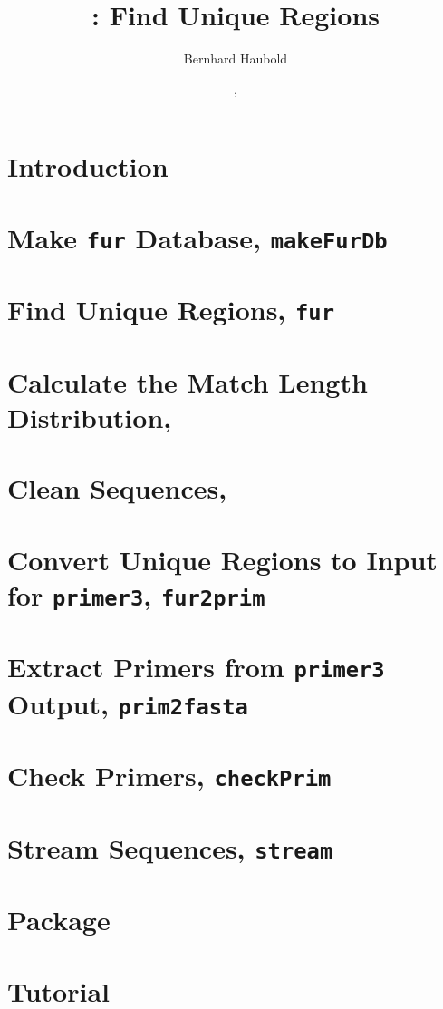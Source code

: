 \documentclass[a4paper]{report}
\begin{document}
\pagestyle{noweb}

\title{: Find Unique Regions}
\author{Bernhard Haubold}
\date{\!\!, }
\maketitle

\tableofcontents

\chapter{Introduction}\label{sec:intro}

\chapter{Make \texttt{fur} Database, \texttt{makeFurDb}}\label{ch:makeFurDb}

\chapter{Find Unique Regions, \texttt{fur}}

\chapter{Calculate the Match Length Distribution, }\label{ch:mad}

\chapter{Clean Sequences, }

\chapter{Convert Unique Regions to Input for \texttt{primer3}, \texttt{fur2prim}}

\chapter{Extract Primers from \texttt{primer3}
Output, \texttt{prim2fasta}}

\chapter{Check Primers, \texttt{checkPrim}}

\chapter{Stream Sequences, \texttt{stream}}

\chapter{Package }

\chapter{Tutorial}\label{ch:tut}



\end{document}
